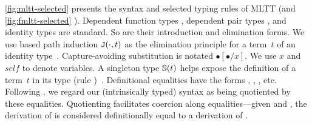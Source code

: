 

\cref{fig:mltt-selected} presents the syntax and selected typing rules of MLTT %
(and \cref{fig:fmltt-selected} \TT).
Dependent function types ,
dependent pair types , and
identity types  are standard.
So are their introduction and elimination forms.
We use based path induction $\texttt{J}({\cdot},{t})$
as the elimination principle for 
a term~$t$ of an identity type~. 
Capture-avoiding substitution is notated $\bullet[\bullet/x]$.
We use $x$ and $\mathit{self}$ to denote variables.
A singleton type $\mathbb{S}({t})$ helps expose the definition of a term~$t$
in its type (rule )~\cite{aspinall1995singleton,stone2000}.
Definitional equalities have the forms %
,
,
,
etc.
Following \citet{altkap2016}, we regard our (intrinsically typed) syntax
as being quotiented by these equalities.
Quotienting facilitates coercion along equalities---given
 and
,
the derivation of  is considered definitionally equal to
a derivation of . %
